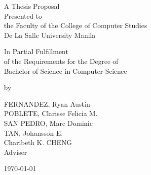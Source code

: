 %
%
%                 

\begin{titlepage}
\centering



\vspace{1.75cm}
A Thesis Proposal\\
Presented to\\
the Faculty of the College of Computer Studies\\
De La Salle University Manila

\vspace{1.75cm}
In Partial Fulfillment\\
of the Requirements for the Degree of\\
Bachelor of  Science in Computer Science

\vspace{1.75cm}
by\\
\vspace{1cm}

FERNANDEZ, Ryan Austin \\
POBLETE, Clarisse Felicia M.  \\
SAN PEDRO, Marc Dominic  \\
TAN, Johansson E.  \\

\vspace{1.75cm}
Charibeth K. CHENG \\
Adviser

\vspace{1.75cm}
\today
\end{titlepage}
